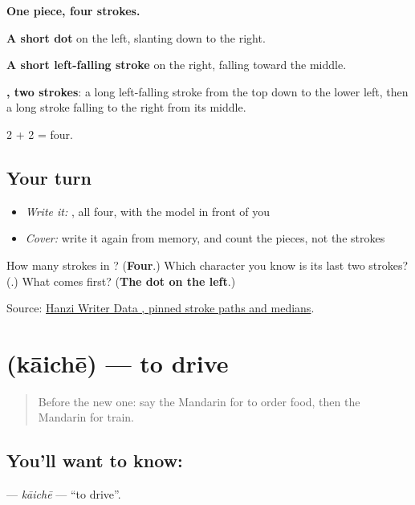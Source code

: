 \begin{quote}
\end{quote}

\textbf{One piece, four strokes.}

\textbf{A short dot} on the left, slanting down to the right.

\textbf{A short left-falling stroke} on the right, falling toward the middle.

\textbf{, two strokes}: a long left-falling stroke from the top down to the lower left, then a long stroke falling to the right from its middle.

2 + 2 = four.

\subsection*{Your turn}
\begin{itemize}
\raggedright
  \item \emph{Write it:} , all four, with the model in front of you
  \item \emph{Cover:} write it again from memory, and count the pieces, not the strokes
\end{itemize}

\begin{tcolorbox}[breakable,colback=teal!4,colframe=teal!35!black,title={Before you move on}]
How many strokes in ? (\textbf{Four}.) Which character you know is its last two strokes? (\textbf{}.) What comes first? (\textbf{The dot on the left}.)

Source: \href{https://raw.githubusercontent.com/chanind/hanzi-writer-data/68d10a4b21150cae5e1ebbd223eed289cf32d90c/data/\%E7\%81\%AB.json}{Hanzi Writer Data , pinned stroke paths and medians}.
\end{tcolorbox}
\section[\texorpdfstring{\zh{开车} (kāichē)}{开车 (kāichē)}]{ (kāichē) — to drive}

\label{lesson:ZH-C72-kaiche}



\begin{quote}
Before the new one: say the Mandarin for to order food, then the Mandarin for train.
\end{quote}

\subsection*{You'll want to know: }
\textbf{} — \emph{kāichē} — \textquotedblleft{}to drive\textquotedblright{}.

